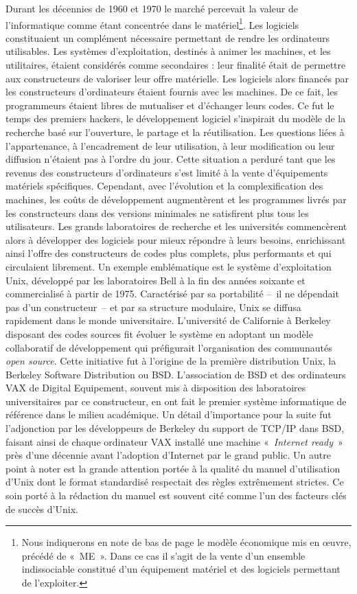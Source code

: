 \documentclass{FramateX}
\begin{document}
\begin{refsection}
Durant les décennies de 1960 et 1970 le marché percevait la valeur de
l'informatique comme étant concentrée dans le
matériel\footnote{Nous indiquerons en note de bas de page le modèle
économique mis en œuvre, précédé de «~ME~». Dans ce cas il
s'agit de la vente d'un ensemble
indissociable constitué d'un équipement matériel et
des logiciels permettant de l'exploiter.}. Les
logiciels constituaient un complément nécessaire permettant de rendre
les ordinateurs utilisables. Les systèmes d'exploitation, destinés à
animer les machines, et les utilitaires, étaient considérés comme
secondaires : leur finalité était de permettre aux constructeurs de
valoriser leur offre matérielle. Les logiciels alors financés par les
constructeurs d'ordinateurs étaient fournis avec les machines. De ce
fait, les programmeurs étaient libres de mutualiser et d'échanger leurs
codes. Ce fut le temps des premiers hackers, le développement logiciel
s'inspirait du modèle de la recherche basé sur
l'ouverture, le partage et la réutilisation. Les
questions liées à l'appartenance, à l'encadrement de
leur utilisation, à leur modification ou leur diffusion
n'étaient pas à l'ordre du jour.
Cette situation a perduré tant que les revenus des constructeurs
d'ordinateurs s'est limité à la vente
d'équipements matériels spécifiques. Cependant, avec
l'évolution et la complexification des machines, les coûts de
développement augmentèrent et les programmes livrés par les
constructeurs dans des versions minimales ne satisfirent plus tous les
utilisateurs. Les grands laboratoires de recherche et les universités
commencèrent alors à développer des logiciels pour mieux répondre à
leurs besoins, enrichissant ainsi l'offre des constructeurs de codes
plus complets, plus performants et qui circulaient librement. Un
exemple emblématique est le système d'exploitation Unix, développé par
les laboratoires Bell à la fin des années soixante et commercialisé à
partir de 1975. Caractérisé par sa portabilité --~il ne dépendait pas
d'un constructeur~-- et par sa structure modulaire, Unix se diffusa
rapidement dans le monde universitaire. L'université de Californie à
Berkeley disposant des codes sources fit évoluer le système en adoptant
un modèle collaboratif de développement qui préfigurait l'organisation
des communautés \textit{open source}. Cette initiative fut à l'origine
de la première distribution Unix, la Berkeley Software Distribution ou
BSD. L'association de BSD et des ordinateurs VAX de Digital Equipement,
souvent mis à disposition des laboratoires universitaires par ce
constructeur, en ont fait le premier système informatique de référence
dans le milieu académique. Un détail d'importance pour la suite fut
l'adjonction par les développeurs de Berkeley du support de TCP/IP dans
BSD, faisant ainsi de chaque ordinateur VAX installé une machine
«~\textit{Internet ready}~» près d'une décennie avant l'adoption
d'Internet par le grand public. Un autre point à noter est la grande
attention portée à la qualité du manuel d'utilisation d'Unix dont le
format standardisé respectait des règles extrêmement strictes. Ce soin
porté à la rédaction du manuel est souvent cité comme l'un des facteurs
clés de succès d'Unix. 


\end{refsection}
\end{document}

